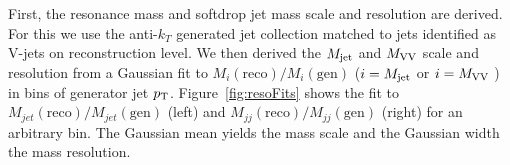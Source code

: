 First, the resonance mass and softdrop jet mass scale and resolution are derived. 
For this we use the anti-$k_T$ generated jet collection matched to jets identified as V-jets on reconstruction level.
We then derived the $M_{\rm jet}$ and $M_{\rm VV}$ scale and resolution from a Gaussian fit to $M_{i}(\mathrm{reco})/M_{i}(\mathrm{gen})$ ($i=M_{\rm jet}$ or $i=M_{\rm VV}$ ) in bins of generator jet $p_{\mathrm{T}}$.
Figure~\ref{fig:resoFits} shows the fit to $M_{jet}(\mathrm{reco})/M_{jet}(\mathrm{gen})$ (left) and $M_{jj}(\mathrm{reco})/M_{jj}(\mathrm{gen})$ (right) for an arbitrary bin. The Gaussian mean yields the mass scale and the Gaussian width the mass resolution.
\begin{figure}[h!]
\centering
{}
\\

\end{figure}
